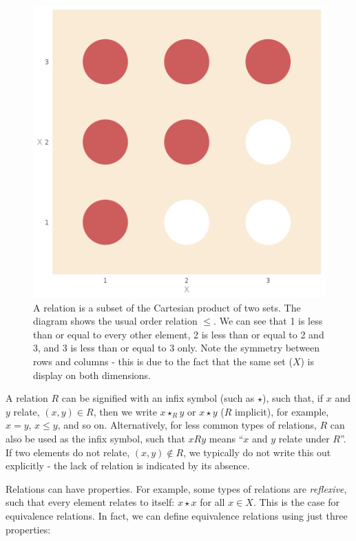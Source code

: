 \documentclass[
]{book}
\theoremstyle{definition}
\theoremstyle{definition}
\theoremstyle{definition}
\theoremstyle{definition}
\theoremstyle{remark}
\begin{document}
\begin{figure}

{\centering \includegraphics[width=1\linewidth,height=1\textheight]{./figures/relations} 

}

\caption{A relation is a subset of the Cartesian product of two sets. The diagram shows the usual order relation $\leq$. We can see that 1 is less than or equal to every other element, 2 is less than or equal to 2 and 3, and 3 is less than or equal to 3 only. Note the symmetry between rows and columns - this is due to the fact that the same set ($X$) is display on both dimensions.}\label{fig:unnamed-chunk-130}
\end{figure}

A relation \(R\) can be signified with an infix symbol (such as \(\star\)), such that, if \(x\) and \(y\) relate, \((x, y) \in R\), then we write \(x \star_R y\) or \(x \star y\) (\(R\) implicit), for example, \(x = y\), \(x \leq y\), and so on. Alternatively, for less common types of relations, \(R\) can also be used as the infix symbol, such that \(x R y\) means ``\(x\) and \(y\) relate under \(R\)''. If two elements do not relate, \((x, y) \not \in R\), we typically do not write this out explicitly - the lack of relation is indicated by its absence.

Relations can have properties. For example, some types of relations are \emph{reflexive}, such that every element relates to itself: \(x \star x\) for all \(x \in X\). This is the case for equivalence relations. In fact, we can define equivalence relations using just three properties:
\end{document}
